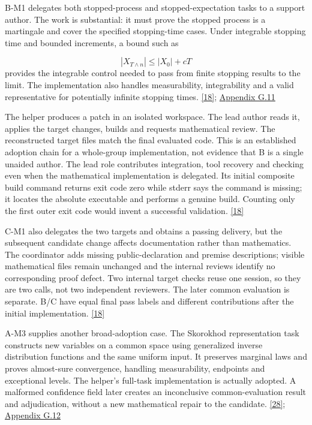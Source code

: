 B-M1 delegates both stopped-process and stopped-expectation tasks to a support author. The work is substantial: it must prove the stopped process is a martingale and cover the specified stopping-time cases. Under integrable stopping time and bounded increments, a bound such as

\[
|X_{T\wedge n}|\leq |X_0|+cT
\]
provides the integrable control needed to pass from finite stopping results to the limit. The implementation also handles measurability, integrability and a valid representative for potentially infinite stopping times. \href{en.pdf\#ref-18}{\mbox{[18]}}; \href{en-appendix.pdf\#g11}{Appendix G.11}

The helper produces a patch in an isolated workspace. The lead author reads it, applies the target changes, builds and requests mathematical review. The reconstructed target files match the final evaluated code. This is an established adoption chain for a whole-group implementation, not evidence that B is a single unaided author. The lead role contributes integration, tool recovery and checking even when the mathematical implementation is delegated. Its initial composite build command returns exit code zero while stderr says the command is missing; it locates the absolute executable and performs a genuine build. Counting only the first outer exit code would invent a successful validation. \href{en.pdf\#ref-18}{\mbox{[18]}}

C-M1 also delegates the two targets and obtains a passing delivery, but the subsequent candidate change affects documentation rather than mathematics. The coordinator adds missing public-declaration and premise descriptions; visible mathematical files remain unchanged and the internal reviews identify no corresponding proof defect. Two internal target checks reuse one session, so they are two calls, not two independent reviewers. The later common evaluation is separate. B/C have equal final pass labels and different contributions after the initial implementation. \href{en.pdf\#ref-18}{\mbox{[18]}}

A-M3 supplies another broad-adoption case. The Skorokhod representation task constructs new variables on a common space using generalized inverse distribution functions and the same uniform input. It preserves marginal laws and proves almost-sure convergence, handling measurability, endpoints and exceptional levels. The helper's full-task implementation is actually adopted. A malformed confidence field later creates an inconclusive common-evaluation result and adjudication, without a new mathematical repair to the candidate. \href{en.pdf\#ref-28}{\mbox{[28]}}; \href{en-appendix.pdf\#g12}{Appendix G.12}


